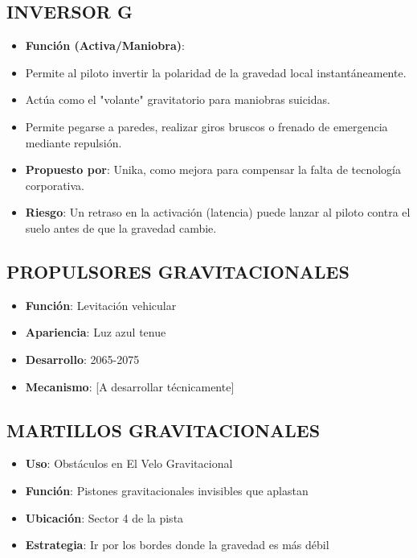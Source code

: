 \documentclass[11pt,a4paper]{report}
\begin{document}
\subsection{INVERSOR G}
\begin{itemize}
  \item \textbf{Función (Activa/Maniobra)}: 
  \item Permite al piloto invertir la polaridad de la gravedad local instantáneamente.
  \item Actúa como el "volante" gravitatorio para maniobras suicidas.
  \item Permite pegarse a paredes, realizar giros bruscos o frenado de emergencia mediante repulsión.
  \item \textbf{Propuesto por}: Unika, como mejora para compensar la falta de tecnología corporativa.
  \item \textbf{Riesgo}: Un retraso en la activación (latencia) puede lanzar al piloto contra el suelo antes de que la gravedad cambie.

\end{itemize}
\subsection{PROPULSORES GRAVITACIONALES}
\begin{itemize}
  \item \textbf{Función}: Levitación vehicular
  \item \textbf{Apariencia}: Luz azul tenue
  \item \textbf{Desarrollo}: 2065-2075
  \item \textbf{Mecanismo}: [A desarrollar técnicamente]

\end{itemize}
\subsection{MARTILLOS GRAVITACIONALES}
\begin{itemize}
  \item \textbf{Uso}: Obstáculos en El Velo Gravitacional
  \item \textbf{Función}: Pistones gravitacionales invisibles que aplastan
  \item \textbf{Ubicación}: Sector 4 de la pista
  \item \textbf{Estrategia}: Ir por los bordes donde la gravedad es más débil

\end{itemize}
\end{document}
